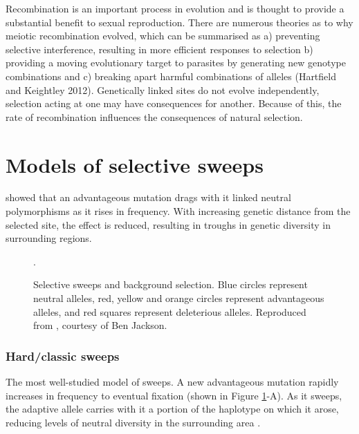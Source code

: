 	Recombination is an important process in evolution and is thought to provide a substantial benefit to sexual reproduction. There are numerous theories as to why meiotic recombination evolved, which can be summarised as a) preventing selective interference, resulting in more efficient responses to selection b) providing a moving evolutionary target to parasites by generating new genotype combinations and c) breaking apart harmful combinations of alleles (Hartfield and Keightley 2012). Genetically linked sites do not evolve independently, selection acting at one may have consequences for another. Because of this, the rate of recombination influences the consequences of natural selection.

\section[Models of selective sweeps]{Models of selective sweeps}

\cite{RN124} showed that an advantageous mutation drags with it linked neutral polymorphisms as it rises in frequency. With increasing genetic distance from the selected site, the effect is reduced, resulting in troughs in genetic diversity in surrounding regions.
 
 \begin{figure}[h!]
   \centering      
   \noindent{}
 \caption[Selective sweeps and background selection]{Selective sweeps and background selection. Blue circles represent neutral alleles, red, yellow and orange circles represent advantageous alleles, and red squares represent deleterious alleles. Reproduced from \cite{RN352}, courtesy of Ben Jackson.}.
 
 \label{fig:sweepCartoon}
\end{figure}


\subsubsection{Hard/classic sweeps} 
 
The most well-studied model of sweeps. A new advantageous mutation rapidly increases in frequency to eventual fixation (shown in Figure \ref{fig:sweepCartoon}-A). As it sweeps, the adaptive allele carries with it a portion of the haplotype on which it arose, reducing levels of neutral diversity in the surrounding area \citep{RN124,RN235}. 
 
